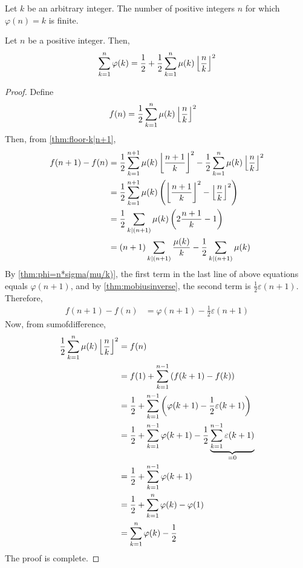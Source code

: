 	\begin{corollary}
		Let $k$ be an arbitrary integer. The number of positive integers $n$ for which $\varphi(n) = k$ is finite.
	\end{corollary}

	\begin{theorem}
		Let $n$ be a positive integer. Then,
			\begin{align*}
				\sum_{k=1}^{n} \varphi(k) = \frac{1}{2} + \frac{1}{2}\sum_{k=1}^{n} \mu(k)\left\lfloor{\frac{n}{k}}\right\rfloor^2
			\end{align*}
	\end{theorem}

	\begin{proof}
		Define
			\begin{align*}
				f(n)
					& = \frac{1}{2}\sum_{k=1}^{n} \mu(k)\left\lfloor{\frac{n}{k}}\right\rfloor^2
			\end{align*}
		Then, from \autoref{thm:floor-k|n+1},
			\begin{align*}
				f(n+1)-f(n) &= \frac{1}{2}\sum_{k=1}^{n+1} \mu(k)\left\lfloor{\frac{n+1}{k}}\right\rfloor^2 - \frac{1}{2}\sum_{k=1}^{n} \mu(k)\left\lfloor{\frac{n}{k}}\right\rfloor^2\\
							&= \frac{1}{2}\sum_{k=1}^{n+1} \mu(k)\left(\left\lfloor{\frac{n+1}{k}}\right\rfloor^2 -\left\lfloor{\frac{n}{k}}\right\rfloor^2\right)\\
							&= \frac{1}{2}\sum_{k\mid (n+1)}\mu(k)\left(2 \frac{n+1}{k}-1\right)\\
							&= (n+1)\sum_{k\mid (n+1)} \frac{\mu(k)}{k} - \frac{1}{2} \sum_{k\mid (n+1)} \mu(k)
			\end{align*}
		By \autoref{thm:phi=n*sigma(mu/k)}, the first term in the last line of above equations equals $\varphi(n+1)$, and by \autoref{thm:mobiusinverse}, the second term is $\frac{1}{2} \varepsilon(n+1)$. Therefore,
			\begin{align*}
				f(n+1)-f(n) &= \varphi(n+1) - \frac{1}{2}\varepsilon(n+1)
			\end{align*}
		Now, from \gls{sumofdifference},
			\begin{align*}
				\frac{1}{2}\sum_{k=1}^{n} \mu(k)\left\lfloor{\frac{n}{k}}\right\rfloor^2
					& = f(n)\\
					& = f(1) + \sum_{k=1}^{n-1} \left(f(k+1)-f(k)\right)\\
					& = \frac{1}{2} + \sum_{k=1}^{n-1} \left(\varphi(k+1) - \frac{1}{2}\varepsilon(k+1)\right)\\
					& = \frac{1}{2} + \sum_{k=1}^{n-1} \varphi(k+1) - \frac{1}{2} \underbrace{\sum_{k=1}^{n-1} \varepsilon(k+1)}_{=0}\\
					& = \frac{1}{2} + \sum_{k=1}^{n-1} \varphi(k+1)\\
					& = \frac{1}{2} + \sum_{k=1}^{n} \varphi(k) - \varphi(1)\\
					& = \sum_{k=1}^{n} \varphi(k) - \frac{1}{2}
			\end{align*}
		The proof is complete.
	\end{proof}

